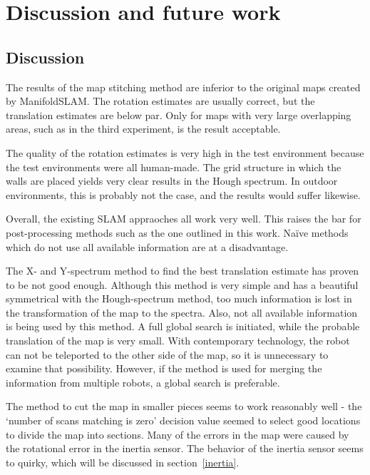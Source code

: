 
\chapter{Discussion and future work}
\label{discussion}

\section{Discussion}
The results of the map stitching method are inferior to the original maps created by ManifoldSLAM. The rotation estimates are usually correct, but the translation estimates are below par. Only for maps with very large overlapping areas, such as in the third experiment, is the result acceptable.

The quality of the rotation estimates is very high in the test environment because the test environments were all human-made. The grid structure in which the walls are placed yields very clear results in the Hough spectrum. In outdoor environments, this is probably not the case, and the results would suffer likewise.

Overall, the existing SLAM appraoches all work very well. This raises the bar for post-processing methods such as the one outlined in this work. Na\"ive methods which do not use all available information are at a disadvantage.

The X- and Y-spectrum method to find the best translation estimate has proven to be not good enough. Although this method is very simple and has a beautiful symmetrical with the Hough-spectrum method, too much information is lost in the transformation of the map to the spectra. Also, not all available information is being used by this method. A full global search is initiated, while the probable translation of the map is very small. With contemporary technology, the robot can not be teleported to the other side of the map, so it is unnecessary to examine that possibility. However, if the method is used for merging the information from multiple robots, a global search is preferable. 

The method to cut the map in smaller pieces seems to work reasonably well - the `number of scans matching is zero' decision value seemed to select good locations to divide the map into sections. Many of the errors in the map were caused by the rotational error in the inertia sensor. The behavior of the inertia sensor seems to quirky, which will be discussed in section~\ref{inertia}.

